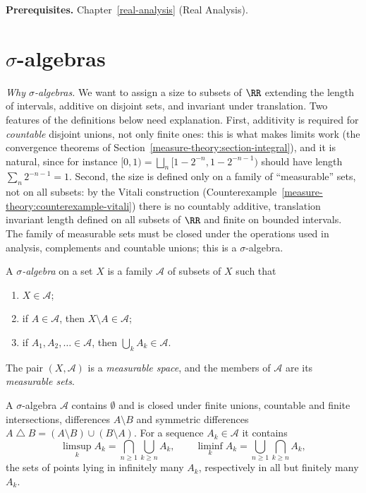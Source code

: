 \noindent\textbf{Prerequisites.} Chapter~\ref{real-analysis} (Real Analysis).

\section{$\sigma$-algebras}\label{measure-theory:section-sigma-algebras}

\emph{Why $\sigma$-algebras.} We want to assign a size to subsets of $\RR$ extending the length of intervals, additive on disjoint sets, and invariant under translation. Two features of the
definitions below need explanation. First, additivity is required for \emph{countable} disjoint unions, not only finite ones: this is what makes limits work (the convergence theorems of
Section~\ref{measure-theory:section-integral}), and it is natural, since for instance $[0, 1) = \bigsqcup_n[1 - 2^{-n}, 1 - 2^{-n-1})$ should have length $\sum_n2^{-n-1} = 1$. Second, the size is defined only
on a family of ``measurable'' sets, not on all subsets: by the Vitali construction (Counterexample~\ref{measure-theory:counterexample-vitali}) there is no countably additive, translation invariant length
defined on all subsets of $\RR$ and finite on bounded intervals. The family of measurable sets must be closed under the operations used in analysis, complements and countable unions; this is a
$\sigma$-algebra.

\begin{definition}\label{measure-theory:definition-sigma-algebra}
A \emph{$\sigma$-algebra} on a set $X$ is a family $\mathcal{A}$ of subsets of $X$ such that
\begin{enumerate}
\item $X \in \mathcal{A}$;
\item if $A \in \mathcal{A}$, then $X \setminus A \in \mathcal{A}$;
\item if $A_1, A_2, \ldots \in \mathcal{A}$, then $\bigcup_kA_k \in \mathcal{A}$.
\end{enumerate}
The pair $(X, \mathcal{A})$ is a \emph{measurable space}, and the members of $\mathcal{A}$ are its \emph{measurable sets}.
\end{definition}

\begin{lemma}\label{measure-theory:lemma-sigma-algebra-closure}
A $\sigma$-algebra $\mathcal{A}$ contains $\emptyset$ and is closed under finite unions, countable and finite intersections, differences $A \setminus B$ and symmetric differences
$A \mathbin{\triangle} B = (A \setminus B) \cup (B \setminus A)$. For a sequence $A_k \in \mathcal{A}$ it contains
\[
\limsup_kA_k = \bigcap_{n \geq 1}\bigcup_{k \geq n}A_k, \qquad \liminf_kA_k = \bigcup_{n \geq 1}\bigcap_{k \geq n}A_k,
\]
the sets of points lying in infinitely many $A_k$, respectively in all but finitely many $A_k$.
\end{lemma}

